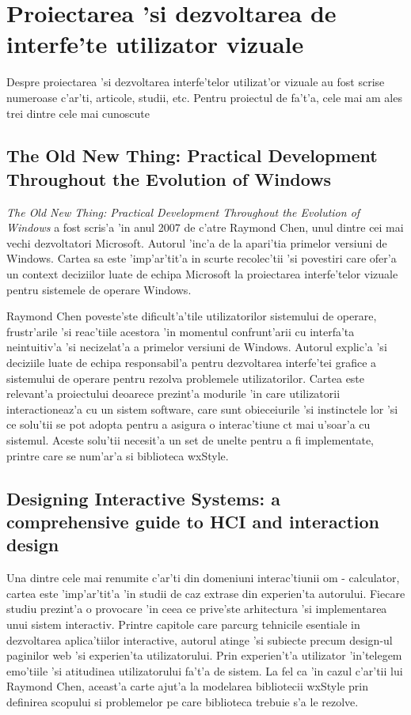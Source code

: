 \section{Proiectarea 'si dezvoltarea de interfe'te utilizator vizuale}

Despre proiectarea 'si dezvoltarea interfe'telor utilizat'or vizuale au fost scrise numeroase c'ar'ti, articole, studii, etc. Pentru proiectul de fa't'a, cele mai am ales trei dintre cele mai cunoscute

\subsection{The Old New Thing: Practical Development Throughout the Evolution of Windows}

\emph{The Old New Thing: Practical Development Throughout the Evolution of Windows} a fost scris'a 'in anul 2007 de c'atre Raymond Chen, unul dintre cei mai vechi dezvoltatori Microsoft. Autorul  'inc'a de la apari'tia primelor versiuni de Windows. Cartea sa este 'imp'ar'tit'a in scurte recolec'tii 'si povestiri care ofer'a un context deciziilor luate de echipa Microsoft la proiectarea interfe'telor vizuale pentru sistemele de operare Windows.

\medskip

Raymond Chen poveste'ste dificult'a'tile utilizatorilor sistemului de operare, frustr'arile 'si reac'tiile acestora 'in momentul confrunt'arii cu interfa'ta neintuitiv'a 'si necizelat'a a primelor versiuni de Windows. Autorul explic'a 'si deciziile luate de echipa responsabil'a pentru dezvoltarea interfe'tei grafice a sistemului de operare pentru rezolva problemele utilizatorilor. Cartea este relevant'a proiectului deoarece prezint'a modurile 'in care utilizatorii interactioneaz'a cu un sistem software, care sunt obieceiurile 'si instinctele lor 'si ce solu'tii se pot adopta pentru a asigura o interac'tiune c{\ia}t mai u'soar'a cu sistemul. Aceste solu'tii necesit'a un set de unelte pentru a fi implementate, printre care se num'ar'a si biblioteca wxStyle.

\subsection{Designing Interactive Systems: a comprehensive guide to HCI and interaction design}

Una dintre cele mai renumite c'ar'ti din domeniuni interac'tiunii om - calculator, cartea este 'imp'ar'tit'a 'in studii de caz extrase din experien'ta autorului. Fiecare studiu prezint'a o provocare 'in ceea ce prive'ste arhitectura 'si implementarea unui sistem interactiv. Printre capitole care parcurg tehnicile esentiale in dezvoltarea aplica'tiilor interactive, autorul atinge 'si subiecte precum design-ul paginilor web 'si experien'ta utilizatorului. Prin experien't'a utilizator 'in'telegem emo'tiile 'si atitudinea utilizatorului fa't'a de sistem. La fel ca 'in cazul c'ar'tii lui Raymond Chen, aceast'a carte ajut'a la modelarea bibliotecii wxStyle prin definirea scopului si problemelor pe care biblioteca trebuie s'a le rezolve.

